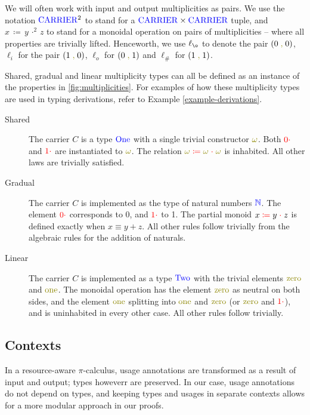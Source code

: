 \documentclass[a4paper,UKenglish,cleveref, autoref, thm-restate,authorcolumns]{lipics-v2019}
\theoremstyle{definition}
\newcommand{\picalc}{$\pi$-calculus}
\newcommand{\type}[1]{\textcolor{blue}{\operatorname{#1}}}
\newcommand{\constr}[1]{\textcolor{olive}{\operatorname{#1}}}
\newcommand{\field}[1]{\textcolor{red}{\operatorname{#1}}}
\newcommand{\comma}{\; \constr{,} \;}
\newcommand{\opsquared}[3]{#1 \, \coloneqq \, #2 \, \cdot^2 \, #3}
\newcommand{\op}[3]{#1 \; \field{\coloneqq} \; #2 \; \field{\cdot} \; #3}
\newcommand{\zero}{\field{0\cdot}}
\newcommand{\one}{\field{1\cdot}}
\newcommand{\li}{\ell_i}
\newcommand{\lo}{\ell_o}
\newcommand{\lz}{\ell_{\o}}
\newcommand{\lio}{\ell_{\#}}
\newcommand{\Carrier}{\type{CARRIER}}
\newcommand{\N}{\type{\mathbb{N}}}
\begin{document}
\begin{note}
  We will often work with input and output multiplicities as pairs.
  We use the notation $\Carrier^2$ to stand for a $\Carrier \times \Carrier$ tuple, and $\opsquared{x}{y}{z}$ to stand for a monoidal operation on pairs of multiplicities -- where all properties are trivially lifted.
  Henceworth, we use $\lz$ to denote the pair $(0 \comma 0)$, $\li$ for the pair $(1 \comma 0)$, $\lo$ for $(0 \comma 1)$ and $\lio$ for $(1 \comma 1)$.
\end{note}

Shared, gradual and linear multiplicity types can all be defined as an instance of the properties in \autoref{fig:multiplicities}.
For examples of how these multiplicity types are used in typing derivations, refer to Example \autoref{example-derivations}.

\begin{description}
  \item [Shared]
    The carrier $C$ is a type $\type{One}$ with a single trivial constructor $\constr{\omega}$.
    Both $\zero$ and $\one$ are instantiated to $\constr{\omega}$.
    The relation $\op{\constr{\omega}}{\constr{\omega}}{\constr{\omega}}$ is inhabited.
    All other laws are trivially satisfied.
  \item [Gradual]
    The carrier $C$ is implemented as the type of natural numbers $\N$.
    The element $\zero$ corresponds to 0, and $\one$ to 1.
    The partial monoid $\op{x}{y}{z}$ is defined exactly when $x \equiv y + z$.
    All other rules follow trivially from the algebraic rules for the addition of naturals.
  \item [Linear]
    The carrier $C$ is implemented as a type $\type{Two}$ with the trivial elements $\constr{zero}$ and $\constr{one}$.
    The monoidal operation has the element $\constr{zero}$ as neutral on both sides, and the element $\constr{one}$ splitting into $\constr{one}$ and $\constr{zero}$ (or $\constr{zero}$ and $\constr{\one}$), and is uninhabited in every other case.
    All other rules follow trivially.
\end{description}

\subsection{Contexts}
\label{contexts}

In a resource-aware \picalc{}, usage annotations are transformed as a result of input and output; types howeverr are preserved.
In our case, usage annotations do not depend on types, and keeping types and usages in separate contexts allows for a more modular approach in our proofs.
\end{document}
